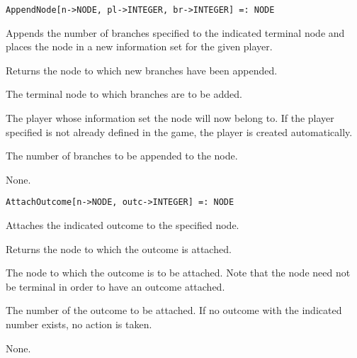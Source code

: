 \begin{itemize}
\item
\protect \Large{\begin{verbatim}
AppendNode[n->NODE, pl->INTEGER, br->INTEGER] =: NODE
\end{verbatim}
\normalsize

\bd
\item
[Description:] Appends the number of branches specified to the
indicated terminal node and places the node in a new information set
for the given player.
\item
[Return value:] Returns the node to which new branches have been appended.
\item
[Required parameters:]\hfil\null
\par
\bd
\item
[ n:] The terminal node to which branches are to be added.
\item
[ pl:] The player whose information set the node will now belong to.
If the player specified is not already defined in the game, the player
is created automatically. 
\item
[ br:] The number of branches to be appended to the node.
\ed

\item
[Optional parameters:] None.
\ed

\item
\protect \Large{\begin{verbatim}
AttachOutcome[n->NODE, outc->INTEGER] =: NODE
\end{verbatim}\normalsize

\bd
\item
[Description:] Attaches the indicated outcome to the specified node.
\item
[Return value:] Returns the node to which the outcome is attached.
\item
[Required parameters:]\hfil\null

\bd
\item
[ n:] The node to which the outcome is to be attached.  Note that the
node need not be terminal in order to have an outcome attached.
\item
[ outc:] The number of the outcome to be attached.  If no outcome
with the indicated number exists, no action is taken.  
\ed

\item
[Optional parameters:] None.
\ed

\item

}}
\end{itemize}
